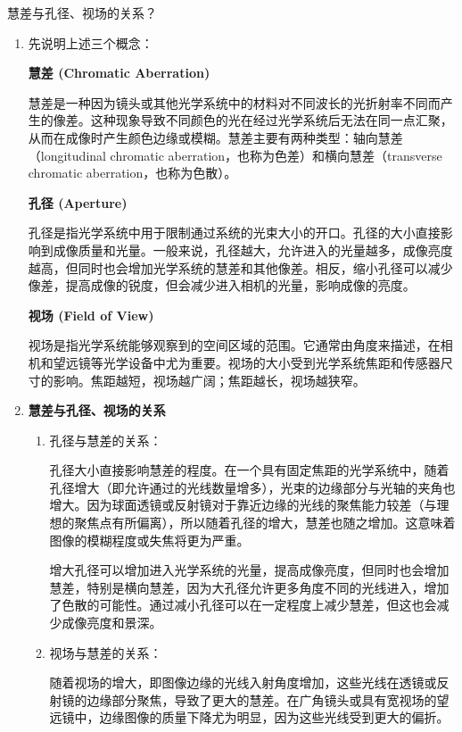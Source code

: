 \documentclass[dvipsnames, svgnames,a4paper,11pt]{article}
\begin{document}
	\begin{question}
		慧差与孔径、视场的关系？
	\end{question}
	\begin{enumerate}
		\item 先说明上述三个概念：
		
		\textbf{慧差 (Chromatic Aberration)}
		
		慧差是一种因为镜头或其他光学系统中的材料对不同波长的光折射率不同而产生的像差。这种现象导致不同颜色的光在经过光学系统后无法在同一点汇聚，从而在成像时产生颜色边缘或模糊。慧差主要有两种类型：轴向慧差（longitudinal chromatic aberration，也称为色差）和横向慧差（transverse chromatic aberration，也称为色散）。
		
		\textbf{孔径 (Aperture)}
		
		孔径是指光学系统中用于限制通过系统的光束大小的开口。孔径的大小直接影响到成像质量和光量。一般来说，孔径越大，允许进入的光量越多，成像亮度越高，但同时也会增加光学系统的慧差和其他像差。相反，缩小孔径可以减少像差，提高成像的锐度，但会减少进入相机的光量，影响成像的亮度。
		
		\textbf{视场 (Field of View)}
		
		视场是指光学系统能够观察到的空间区域的范围。它通常由角度来描述，在相机和望远镜等光学设备中尤为重要。视场的大小受到光学系统焦距和传感器尺寸的影响。焦距越短，视场越广阔；焦距越长，视场越狭窄。
		
		\item \textbf{慧差与孔径、视场的关系}
		\begin{enumerate}
			\item 孔径与慧差的关系：
			
			孔径大小直接影响慧差的程度。在一个具有固定焦距的光学系统中，随着孔径增大（即允许通过的光线数量增多），光束的边缘部分与光轴的夹角也增大。因为球面透镜或反射镜对于靠近边缘的光线的聚焦能力较差（与理想的聚焦点有所偏离），所以随着孔径的增大，慧差也随之增加。这意味着图像的模糊程度或失焦将更为严重。
			
			增大孔径可以增加进入光学系统的光量，提高成像亮度，但同时也会增加慧差，特别是横向慧差，因为大孔径允许更多角度不同的光线进入，增加了色散的可能性。通过减小孔径可以在一定程度上减少慧差，但这也会减少成像亮度和景深。
			\item 视场与慧差的关系：
			
			随着视场的增大，即图像边缘的光线入射角度增加，这些光线在透镜或反射镜的边缘部分聚焦，导致了更大的慧差。在广角镜头或具有宽视场的望远镜中，边缘图像的质量下降尤为明显，因为这些光线受到更大的偏折。
			

\end{enumerate}
\end{enumerate}
\end{document}
